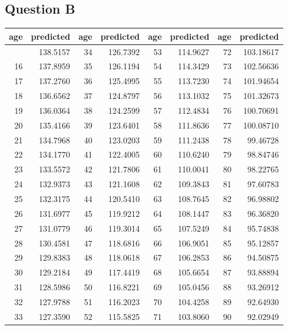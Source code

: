 \documentclass[
]{article}
\begin{document}
\newpage

\hypertarget{question-b}{%
\subsection{Question B}\label{question-b}}

\begin{longtable}[]{@{}rrrrrrrr@{}}
\toprule\noalign{}
age & predicted & age & predicted & age & predicted & age & predicted \\
\midrule\noalign{}
\endhead
\bottomrule\noalign{}
\endlastfoot
15 & 138.5157 & 34 & 126.7392 & 53 & 114.9627 & 72 & 103.18617 \\
16 & 137.8959 & 35 & 126.1194 & 54 & 114.3429 & 73 & 102.56636 \\
17 & 137.2760 & 36 & 125.4995 & 55 & 113.7230 & 74 & 101.94654 \\
18 & 136.6562 & 37 & 124.8797 & 56 & 113.1032 & 75 & 101.32673 \\
19 & 136.0364 & 38 & 124.2599 & 57 & 112.4834 & 76 & 100.70691 \\
20 & 135.4166 & 39 & 123.6401 & 58 & 111.8636 & 77 & 100.08710 \\
21 & 134.7968 & 40 & 123.0203 & 59 & 111.2438 & 78 & 99.46728 \\
22 & 134.1770 & 41 & 122.4005 & 60 & 110.6240 & 79 & 98.84746 \\
23 & 133.5572 & 42 & 121.7806 & 61 & 110.0041 & 80 & 98.22765 \\
24 & 132.9373 & 43 & 121.1608 & 62 & 109.3843 & 81 & 97.60783 \\
25 & 132.3175 & 44 & 120.5410 & 63 & 108.7645 & 82 & 96.98802 \\
26 & 131.6977 & 45 & 119.9212 & 64 & 108.1447 & 83 & 96.36820 \\
27 & 131.0779 & 46 & 119.3014 & 65 & 107.5249 & 84 & 95.74838 \\
28 & 130.4581 & 47 & 118.6816 & 66 & 106.9051 & 85 & 95.12857 \\
29 & 129.8383 & 48 & 118.0618 & 67 & 106.2853 & 86 & 94.50875 \\
30 & 129.2184 & 49 & 117.4419 & 68 & 105.6654 & 87 & 93.88894 \\
31 & 128.5986 & 50 & 116.8221 & 69 & 105.0456 & 88 & 93.26912 \\
32 & 127.9788 & 51 & 116.2023 & 70 & 104.4258 & 89 & 92.64930 \\
33 & 127.3590 & 52 & 115.5825 & 71 & 103.8060 & 90 & 92.02949 \\
\end{longtable}
\end{document}

